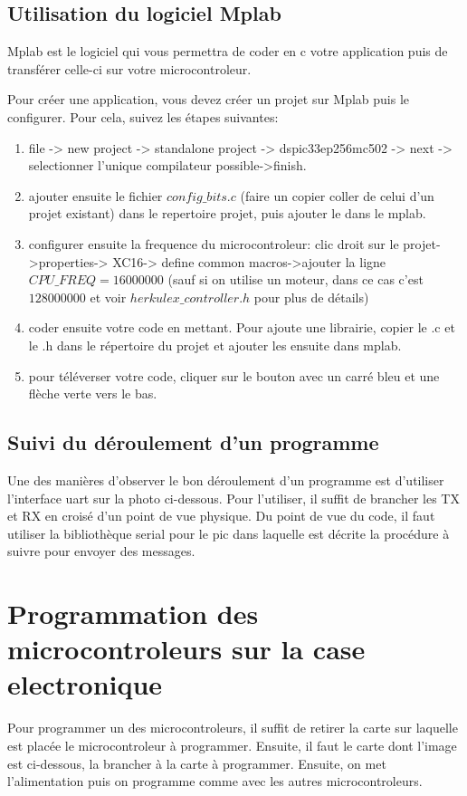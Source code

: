 \documentclass{article}
\begin{document}
\subsection{Utilisation du logiciel Mplab}
Mplab est le logiciel qui vous permettra de coder en c votre application puis de transférer celle-ci
sur votre microcontroleur.

Pour créer une application, vous devez créer un projet sur Mplab puis le configurer. Pour cela,
suivez les étapes suivantes:
\begin{enumerate}
\item file -> new project -> standalone project -> dspic33ep256mc502 -> next -> selectionner l'unique compilateur possible->finish.
\item ajouter ensuite le fichier $config\_bits.c$ (faire un copier coller de celui d'un projet existant) dans le repertoire projet, puis ajouter le dans le mplab.
\item configurer ensuite la frequence du microcontroleur: clic droit sur le projet->properties-> XC16-> define common macros->ajouter la ligne $CPU\_FREQ=16000000$ (sauf si on utilise un moteur, dans ce cas c'est $128000000$ et voir $herkulex\_controller.h$ pour plus de détails)
\item coder ensuite votre code en mettant. Pour ajoute une librairie, copier le .c et le .h dans
le répertoire du projet et ajouter les ensuite dans mplab.
\item pour téléverser votre code, cliquer sur le bouton avec un carré bleu et une flèche verte vers le bas.
\end{enumerate}

\subsection{Suivi du déroulement d'un programme}
Une des manières d'observer le bon déroulement d'un programme est d'utiliser l'interface uart sur la photo ci-dessous.
Pour l'utiliser, il suffit de brancher les TX et RX en croisé d'un point de vue physique. 
Du point de vue du code, il faut utiliser la bibliothèque serial pour le pic dans laquelle est décrite la 
procédure à suivre pour envoyer des messages.

\section{Programmation des microcontroleurs sur la case electronique}
Pour programmer un des microcontroleurs, il suffit de retirer la carte sur laquelle est placée
le microcontroleur à programmer. Ensuite, il faut le carte dont l'image est ci-dessous, la brancher
à la carte à programmer. Ensuite, on met l'alimentation puis on programme comme avec les autres microcontroleurs.
\end{document}
